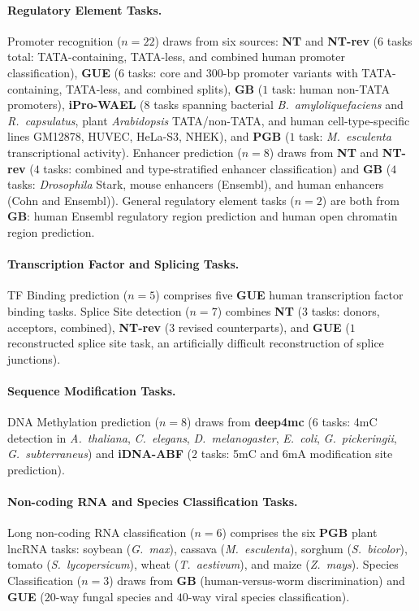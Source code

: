 \documentclass{llmxive}
\begin{document}
\paragraph{Regulatory Element Tasks.} Promoter recognition
($n=22$) draws from six sources: \textbf{NT} and \textbf{NT-rev}
($6$ tasks total: TATA-containing, TATA-less, and combined human
promoter classification), \textbf{GUE} ($6$ tasks: core and 300-bp promoter variants with TATA-containing,
TATA-less, and combined splits), \textbf{GB} ($1$ task:
human non-TATA promoters), \textbf{iPro-WAEL} ($8$ tasks spanning
bacterial \textit{B.\ amyloliquefaciens} and
\textit{R.\ capsulatus}, plant \textit{Arabidopsis} TATA/non-TATA,
and human cell-type-specific lines GM12878, HUVEC, HeLa-S3,
NHEK), and \textbf{PGB} ($1$ task: \textit{M.\ esculenta}
transcriptional activity). Enhancer prediction ($n=8$) draws
from \textbf{NT} and \textbf{NT-rev} ($4$ tasks: combined and
type-stratified enhancer classification) and \textbf{GB}
($4$ tasks: \textit{Drosophila} Stark, mouse enhancers (Ensembl),
and human enhancers (Cohn and Ensembl)). General regulatory
element tasks ($n=2$) are both from \textbf{GB}: human Ensembl
regulatory region prediction and human open chromatin region
prediction.

\paragraph{Transcription Factor and Splicing Tasks.} TF Binding
prediction ($n=5$) comprises five \textbf{GUE} human transcription
factor binding tasks. Splice Site detection ($n=7$) combines
\textbf{NT} ($3$ tasks: donors, acceptors, combined),
\textbf{NT-rev} ($3$ revised counterparts), and \textbf{GUE}
($1$ reconstructed splice site task, an artificially difficult
reconstruction of splice junctions).

\paragraph{Sequence Modification Tasks.} DNA Methylation
prediction ($n=8$) draws from \textbf{deep4mc} ($6$ tasks: 4mC
detection in \textit{A.\ thaliana}, \textit{C.\ elegans},
\textit{D.\ melanogaster}, \textit{E.\ coli},
\textit{G.\ pickeringii}, \textit{G.\ subterraneus}) and
\textbf{iDNA-ABF} ($2$ tasks: 5mC and 6mA modification site
prediction).

\paragraph{Non-coding RNA and Species Classification Tasks.}
Long non-coding RNA classification ($n=6$) comprises the six
\textbf{PGB} plant lncRNA tasks: soybean (\textit{G.\ max}),
cassava (\textit{M.\ esculenta}), sorghum
(\textit{S.\ bicolor}), tomato (\textit{S.\ lycopersicum}),
wheat (\textit{T.\ aestivum}), and maize (\textit{Z.\ mays}).
Species Classification ($n=3$) draws from \textbf{GB}
(human-versus-worm discrimination) and \textbf{GUE} ($20$-way
fungal species and $40$-way viral species classification).
\end{document}
